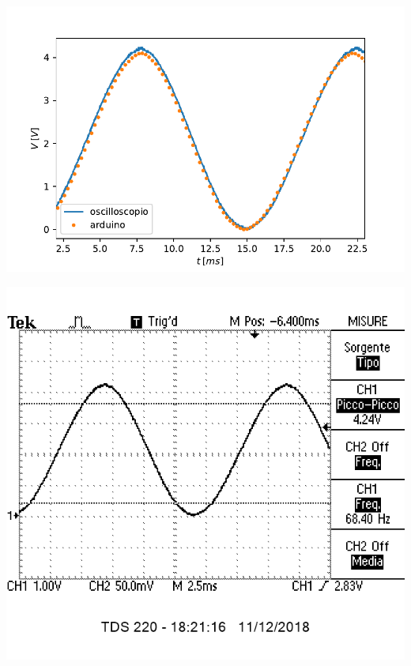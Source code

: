 \documentclass[10pt,oneside,a4paper]{article}
\newenvironment{Figure}
  {\par\medskip\noindent\minipage{\linewidth}}
  {\endminipage\par\medskip}
\begin{document}
\begin{multicols}{2}
\begin{Figure}
	\begin{center}
	\includegraphics[width=\linewidth]{sinSovrapposta.pdf}
	\label{fig:ADC_sinusoidale}
	\end{center}
\end{Figure}

\begin{Figure}
	\begin{center}
	\includegraphics[width=\linewidth]{ingressoArduinoADCSin}
	\label{fig:oscilloscopio_ADC_sinusoidale}
	\end{center}
\end{Figure}


\end{multicols}
\end{document}

